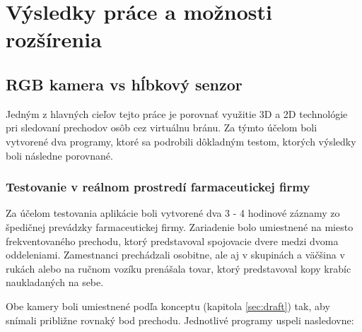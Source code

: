 \chapter{Výsledky práce a možnosti rozšírenia}
\section{RGB kamera vs hĺbkový senzor}
Jedným z hlavných cieľov tejto práce je porovnať využitie 3D a 2D technológie pri sledovaní prechodov osôb cez virtuálnu bránu. Za týmto účelom boli vytvorené dva programy, ktoré sa podrobili dôkladným testom, ktorých výsledky boli následne porovnané. 

\subsection{Testovanie v reálnom prostredí farmaceutickej firmy}
Za účelom testovania aplikácie boli vytvorené dva 3 - 4 hodinové záznamy zo špedičnej prevádzky farmaceutickej firmy. Zariadenie bolo umiestnené na miesto frekventovaného prechodu, ktorý predstavoval spojovacie dvere medzi dvoma oddeleniami. Zamestnanci prechádzali osobitne, ale aj v skupinách a väčšina v rukách alebo na ručnom vozíku prenášala tovar, ktorý predstavoval kopy krabíc naukladaných na sebe. 

Obe kamery boli umiestnené podľa konceptu (kapitola \ref{sec:draft}) tak, aby snímali približne rovnaký bod prechodu. Jednotlivé programy uspeli nasledovne:  

